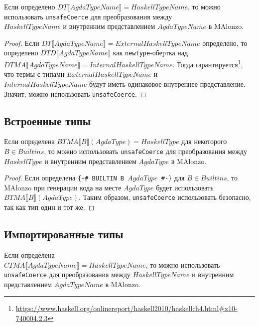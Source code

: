 \begin{thm}
Если определено \(DT\llbracket AgdaTypeName \rrbracket = HaskellTypeName\), то
можно использовать \texttt{unsafeCoerce} для преобразования между\\
\(HaskellTypeName\) и внутренним представлением \(AgdaTypeName\) в MAlonzo.
\end{thm}

\begin{proof}
Если \(DT\llbracket AgdaTypeName \rrbracket = ExternalHaskellTypeName\) определено,
то определено \(DTD\llbracket AgdaTypeName \rrbracket\) как \texttt{newtype}-обертка
над \(DTMA\llbracket AgdaTypeName \rrbracket = InternalHaskellTypeName\).
Тогда гарантируется\footnote{
\url{https://www.haskell.org/onlinereport/haskell2010/haskellch4.html\#x10-740004.2.3}},
что термы с типами \(ExternalHaskellTypeName\) и \\\(InternalHaskellTypeName\) будут иметь
одинаковое внутреннее представление. Значит, можно использовать \texttt{unsafeCoerce}.
\end{proof}

\subsection{Встроенные типы}

\begin{thm}
Если определена \(BTMA\llbracket B \rrbracket(AgdaType) = HaskellType\) для
некоторого \(B \in Builtins\), то можно использовать \texttt{unsafeCoerce}
для преобразования между \(HaskellType\) и внутренним представлением \(AgdaType\) в
MAlonzo.
\end{thm}

\begin{proof}
Если определена \texttt{\{-\# BUILTIN B \(AgdaType\) \#-\}} для \(B \in Builtins\),
то MAlonzo при генерации кода на месте \(AgdaType\) будет использовать
\(BTMA\llbracket B \rrbracket(AgdaType)\). Таким образом, \texttt{unsafeCoerce}
использовать безопасно, так как тип один и тот же.
\end{proof}

\subsection{Импортированные типы}

\begin{thm}
Если определена\\ \(CTMA\llbracket AgdaTypeName \rrbracket = HaskellTypeName\), то
можно использовать \texttt{unsafeCoerce} для преобразования между
\(HaskellTypeName\) и внутренним представлением \(AgdaTypeName\) в MAlonzo.
\end{thm}

